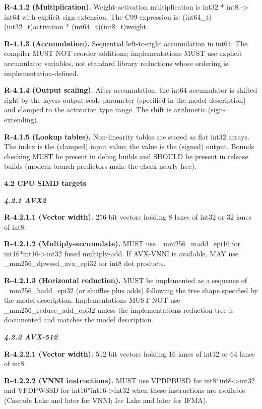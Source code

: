 \documentclass[
]{article}
\begin{document}
\textbf{R-4.1.2 (Multiplication).} Weight-activation multiplication is
int32 * int8 -\textgreater{} int64 with explicit sign extension. The C99
expression is: (int64\_t)(int32\_t)activation *
(int64\_t)(int8\_t)weight.

\textbf{R-4.1.3 (Accumulation).} Sequential left-to-right accumulation
in int64. The compiler MUST NOT reorder additions; implementations MUST
use explicit accumulator variables, not standard library reductions
whose ordering is implementation-defined.

\textbf{R-4.1.4 (Output scaling).} After accumulation, the int64
accumulator is shifted right by the layer\textquotesingle s output-scale
parameter (specified in the model description) and clamped to the
activation type range. The shift is arithmetic (sign-extending).

\textbf{R-4.1.5 (Lookup tables).} Non-linearity tables are stored as
flat int32 arrays. The index is the (clamped) input value; the value is
the (signed) output. Bounds checking MUST be present in debug builds and
SHOULD be present in release builds (modern branch predictors make the
check nearly free).

\textbf{4.2 CPU SIMD targets}

\emph{\textbf{4.2.1 AVX2}}

\textbf{R-4.2.1.1 (Vector width).} 256-bit vectors holding 8 lanes of
int32 or 32 lanes of int8.

\textbf{R-4.2.1.2 (Multiply-accumulate).} MUST use \_mm256\_madd\_epi16
for int16*int16-\textgreater int32 fused multiply-add. If AVX-VNNI is
available, MAY use \_mm256\_dpwssd\_avx\_epi32 for int8 dot products.

\textbf{R-4.2.1.3 (Horizontal reduction).} MUST be implemented as a
sequence of \_mm256\_hadd\_epi32 (or shuffles plus adds) following the
tree shape specified by the model description. Implementations MUST NOT
use \_mm256\_reduce\_add\_epi32 unless the
implementation\textquotesingle s reduction tree is documented and
matches the model description.

\emph{\textbf{4.2.2 AVX-512}}

\textbf{R-4.2.2.1 (Vector width).} 512-bit vectors holding 16 lanes of
int32 or 64 lanes of int8.

\textbf{R-4.2.2.2 (VNNI instructions).} MUST use VPDPBUSD for
int8*int8-\textgreater int32 and VPDPWSSD for
int16*int16-\textgreater int32 when these instructions are available
(Cascade Lake and later for VNNI; Ice Lake and later for IFMA).
\end{document}
